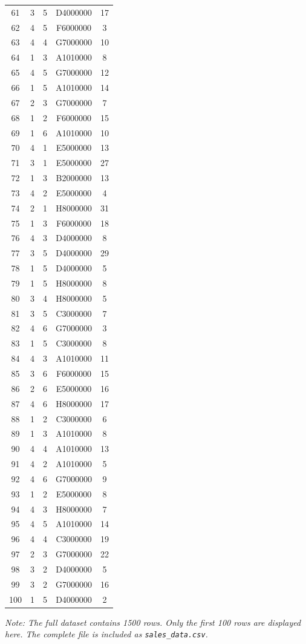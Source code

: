 \documentclass[12pt,a4paper]{article}
\begin{document}
\begin{center}
\begin{longtable}{c c c c c}
61 & 3 & 5 & D4000000 & 17 \\
62 & 4 & 5 & F6000000 & 3 \\
63 & 4 & 4 & G7000000 & 10 \\
64 & 1 & 3 & A1010000 & 8 \\
65 & 4 & 5 & G7000000 & 12 \\
66 & 1 & 5 & A1010000 & 14 \\
67 & 2 & 3 & G7000000 & 7 \\
68 & 1 & 2 & F6000000 & 15 \\
69 & 1 & 6 & A1010000 & 10 \\
70 & 4 & 1 & E5000000 & 13 \\
71 & 3 & 1 & E5000000 & 27 \\
72 & 1 & 3 & B2000000 & 13 \\
73 & 4 & 2 & E5000000 & 4 \\
74 & 2 & 1 & H8000000 & 31 \\
75 & 1 & 3 & F6000000 & 18 \\
76 & 4 & 3 & D4000000 & 8 \\
77 & 3 & 5 & D4000000 & 29 \\
78 & 1 & 5 & D4000000 & 5 \\
79 & 1 & 5 & H8000000 & 8 \\
80 & 3 & 4 & H8000000 & 5 \\
81 & 3 & 5 & C3000000 & 7 \\
82 & 4 & 6 & G7000000 & 3 \\
83 & 1 & 5 & C3000000 & 8 \\
84 & 4 & 3 & A1010000 & 11 \\
85 & 3 & 6 & F6000000 & 15 \\
86 & 2 & 6 & E5000000 & 16 \\
87 & 4 & 6 & H8000000 & 17 \\
88 & 1 & 2 & C3000000 & 6 \\
89 & 1 & 3 & A1010000 & 8 \\
90 & 4 & 4 & A1010000 & 13 \\
91 & 4 & 2 & A1010000 & 5 \\
92 & 4 & 6 & G7000000 & 9 \\
93 & 1 & 2 & E5000000 & 8 \\
94 & 4 & 3 & H8000000 & 7 \\
95 & 4 & 5 & A1010000 & 14 \\
96 & 4 & 4 & C3000000 & 19 \\
97 & 2 & 3 & G7000000 & 22 \\
98 & 3 & 2 & D4000000 & 5 \\
99 & 3 & 2 & G7000000 & 16 \\
100 & 1 & 5 & D4000000 & 2 \\
\end{longtable}
\end{center}

\vspace{1em}
\noindent\textit{Note: The full dataset contains 1500 rows. Only the first 100 rows are displayed here. The complete file is included as \texttt{sales\_data.csv}.}
\end{document}
